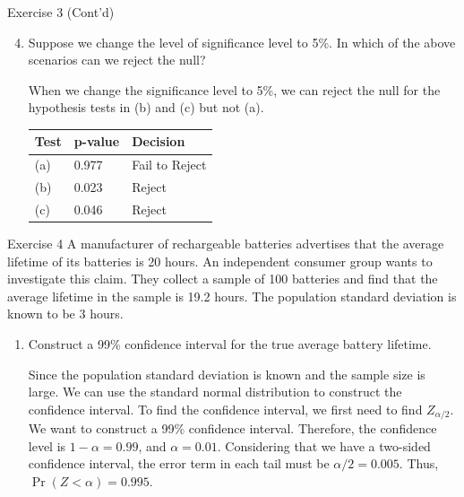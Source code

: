 \documentclass[
  ignorenonframetext,
  aspectratio=43,
]{beamer}
\let\olditem\item
\renewcommand\item{\olditem\justifying}
\begin{document}
\begin{frame}{Exercise 3 (Cont'd)}
\protect\hypertarget{exercise-3-contd-7}{}
\begin{enumerate}
\setcounter{enumi}{3}
\item
  Suppose we change the level of significance level to 5\%. In which of
  the above scenarios can we reject the null?

  When we change the significance level to 5\%, we can reject the null
  for the hypothesis tests in (b) and (c) but not (a).

  \begin{longtable}[]{@{}lll@{}}
  \toprule()
  Test & p-value & Decision \\
  \midrule()
  \endhead
  (a) & 0.977 & Fail to Reject \\
  (b) & 0.023 & Reject \\
  (c) & 0.046 & Reject \\
  \bottomrule()
  \end{longtable}
\end{enumerate}
\end{frame}

\begin{frame}{Exercise 4}
\protect\hypertarget{exercise-4}{}
A manufacturer of rechargeable batteries advertises that the average
lifetime of its batteries is 20 hours. An independent consumer group
wants to investigate this claim. They collect a sample of 100 batteries
and find that the average lifetime in the sample is 19.2 hours. The
population standard deviation is known to be 3 hours.

\begin{enumerate}
\item
  Construct a 99\% confidence interval for the true average battery
  lifetime.

  \pause

  Since the population standard deviation is known and the sample size
  is large. We can use the standard normal distribution to construct the
  confidence interval. To find the confidence interval, we first need to
  find \(Z_{\alpha/2}\). We want to construct a 99\% confidence
  interval. Therefore, the confidence level is \(1-\alpha = 0.99\), and
  \(\alpha = 0.01\). Considering that we have a two-sided confidence
  interval, the error term in each tail must be \(\alpha/2 = 0.005\).
  Thus, \(\Pr(Z < \alpha) = 0.995\).
\end{enumerate}
\end{frame}
\end{document}
